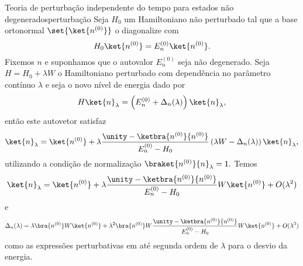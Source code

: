 \begin{theorem}{Teoria de perturbação independente do tempo para estados não degenerados}{perturbação}
    Seja \(H_0\) um Hamiltoniano não perturbado tal que a base ortonormal \(\set{\ket{n^{(0)}}}\) o diagonalize com
    \begin{equation*}
        H_0 \ket{n^{(0)}} = E_n^{(0)} \ket{n^{(0)}}.
    \end{equation*}
    Fixemos \(n\) e suponhamos que o autovalor \(E_n^{(0)}\) seja não degenerado. Seja \(H = H_0 + \lambda W\) o Hamiltoniano perturbado com dependência no parâmetro contínuo \(\lambda\) e seja o novo nível de energia dado por
    \begin{equation*}
        H \ket{n}_\lambda = \left(E_n^{(0)} + \Delta_n(\lambda)\right)\ket{n}_\lambda,
    \end{equation*}
    então este autovetor satisfaz
    \begin{equation*}
        \ket{n}_\lambda = \ket{n^{(0)}} + \lambda \frac{\unity - \ketbra{n^{(0)}}{n^{(0)}}}{E_n^{(0)} - H_0} \left(\lambda W - \Delta_n(\lambda)\right)\ket{n}_\lambda,
    \end{equation*}
    utilizando a condição de normalização \(\braket{n^{(0)}}{n}_\lambda = 1.\) Temos
    \begin{equation*}
        \ket{n}_\lambda = \ket{n^{(0)}} + \lambda \frac{\unity - \ketbra{n^{(0)}}{n^{(0)}}}{E_n^{(0)} - H_0}W\ket{n^{(0)}} + O(\lambda^2)
    \end{equation*}
    e
    \begin{equation*}
        \Delta_n(\lambda) = \lambda \bra{n^{(0)}} W \ket{n^{(0)}} + \lambda^2 \bra{n^{(0)}} W \frac{\unity - \ketbra{n^{(0)}}{n^{(0)}}}{E_n^{(0)} - H_0} W \ket{n^{(0)}} + O(\lambda^3)
    \end{equation*}
    como as expressões perturbativas em até segunda ordem de \(\lambda\) para o desvio da energia.
\end{theorem}
